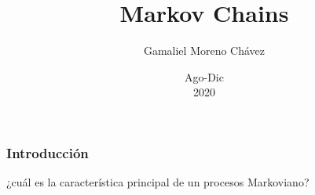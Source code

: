 \documentclass[spanish]{beamer}
\begin{document}
\title{Markov Chains}
\author{Gamaliel Moreno Chávez}
\date{Ago-Dic\\ 2020}%

\frame{\titlepage}

\begin{frame}
\frametitle{Introducción}
\begin{center}
{\huge ¿cuál es la característica principal de un procesos Markoviano?}
\end{center}

 
\end{frame}
\end{document}
